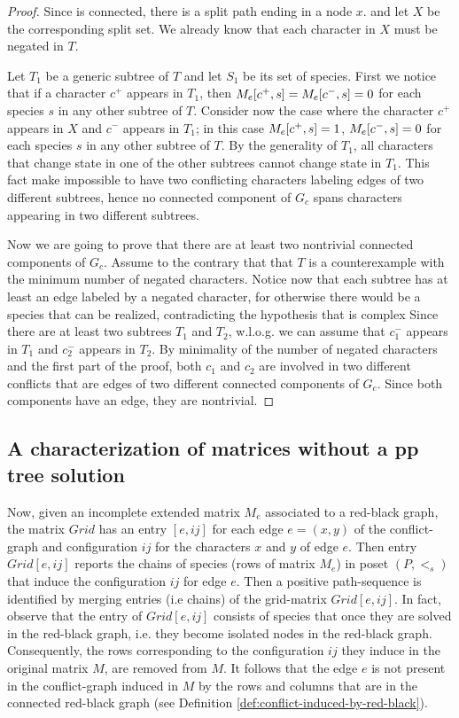 \begin{proof} %
Since \grb is connected, there is a split path ending in a node $x$. and let
$X$ be the corresponding split set.
We already know that each character in
$X$ must be negated in $T$.

Let $T_{1}$ be a generic subtree of $T$ and let $S_{1}$ be its set of species.
First we notice that if a character $c^{+}$ appears in $T_{1}$, then
$M_{e}[c^{+},s]=M_{e}[c^{-},s]=0$ for each species $s$ in any other subtree of $T$.
Consider now the case where the character $c^{+}$ appears in $X$ and $c^{-}$
appears in $T_{1}$; in this case $M_{e}[c^{+},s]=1$, $M_{e}[c^{-},s]=0$ for each
species $s$ in any other subtree of $T$.
By the generality of $T_{1}$, all characters that change state in one of the
other subtrees cannot change state in $T_{1}$.
This fact make impossible to have two conflicting characters labeling edges of
two different subtrees, hence no connected component of $G_{c}$ spans characters
appearing in two different subtrees.

Now we are going to prove that there are at least two nontrivial connected
components of $G_{c}$.
Assume to the contrary that that $T$ is a counterexample with the minimum number
of negated characters.
Notice now that each subtree has at least an edge labeled by a negated
character, for otherwise there would be a species that can be realized,
contradicting the hypothesis that \grb is complex
Since there are at least two subtrees $T_{1}$ and $T_{2}$, w.l.o.g. we can
assume that $c_{1}^{-}$ appears in $T_{1}$ and $c_{2}^{-}$ appears in $T_{2}$.
By minimality of the number of negated characters and the first part of the
proof, both $c_{1}$ and $c_{2}$ are involved in two different conflicts that are
edges of two different connected components of $G_{c}$.
Since both components have an edge, they are nontrivial.
\end{proof}




\subsection*{A characterization of matrices without a pp tree solution}


Now, given
an incomplete extended matrix $M_e$ associated to a red-black graph,  the
matrix $Grid$  has an entry $ [e, ij]$ for each edge $e= (x,y)$ of the
conflict-graph  and configuration $ij$  for the characters $x$ and $y$ of edge
$e$. Then entry $Grid[e, ij]$ reports the chains of species (rows of matrix
$M_e$)  in poset $(P,<_s)$ that induce the configuration $ij$ for edge $e$.
Then a \initial positive path-sequence is identified by merging entries (i.e
chains) of the grid-matrix $Grid[e, ij]$.  In fact, observe that  the  entry of
$Grid[e, ij]$ consists of  species that once they are solved in the red-black
graph, i.e. they become isolated nodes in the red-black graph. Consequently,
the rows corresponding to  the configuration $ij$
they induce in the original matrix $M$, are  removed from $M$. It follows that
the edge $e$ is not present in the  conflict-graph induced in $M$ by the rows
and columns
that are in the connected red-black graph (see Definition
\ref{def:conflict-induced-by-red-black}).


